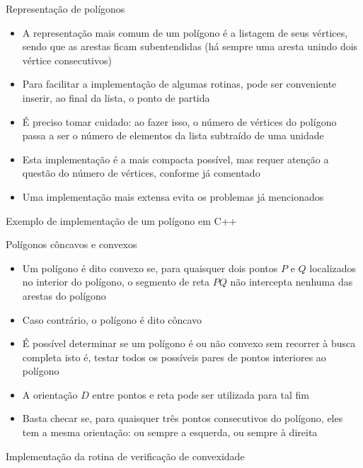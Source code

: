 \begin{frame}[fragile]{Representação de polígonos}

    \begin{itemize}
        \item A representação mais comum de um polígono é a listagem de seus vértices, sendo que 
            as arestas ficam subentendidas (há sempre uma aresta unindo dois vértice consecutivos) 

        \item Para facilitar a implementação de algumas rotinas, pode ser conveniente inserir, 
            ao final da lista, o ponto de partida

        \item É preciso tomar cuidado: ao fazer isso, o 
            número de vértices do polígono passa a ser o número de elementos da lista subtraído 
            de uma unidade    


        \item Esta implementação é a mais compacta possível, mas requer atenção a questão do 
            número de vértices, conforme já comentado

        \item Uma implementação mais extensa evita os problemas já mencionados
    \end{itemize}

\end{frame}

\begin{frame}[fragile]{Exemplo de implementação de um polígono em C++}
\end{frame}

\begin{frame}[fragile]{Polígonos côncavos e convexos}

    \begin{itemize}
        \item Um polígono é dito convexo se, para quaisquer dois pontos $P$ e $Q$ localizados no 
            interior do polígono, o segmento de reta $PQ$ não intercepta nenhuma das arestas do 
            polígono

        \item Caso contrário, o polígono é dito côncavo

        \item É possível determinar se um polígono é ou não convexo sem recorrer à busca completa 
            isto é, testar todos os possíveis pares de pontos interiores ao polígono

        \item A orientação $D$ entre pontos e reta pode ser utilizada para tal fim

        \item Basta checar se, para quaisquer três pontos consecutivos do polígono, eles tem a 
            mesma orientação: ou sempre a esquerda, ou sempre à direita
    \end{itemize}

\end{frame}

\begin{frame}[fragile]{Implementação da rotina de verificação de convexidade}
\end{frame}


